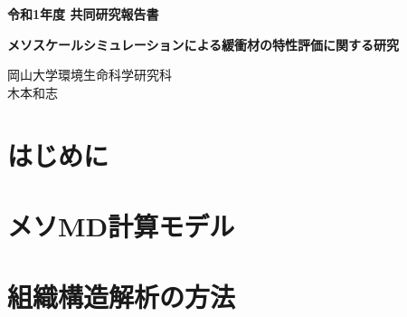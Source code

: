 ﻿\documentclass[11pt,a4j]{jarticle}
\newlength{\minitwocolumn}
\begin{document}
\newcommand{\fat}[1]{\mbox{\boldmath $#1$}}
\newcommand{\D}{\partial}
\newcommand{\w}{\omega}
\newcommand{\ga}{\alpha}
\newcommand{\gb}{\beta}
\newcommand{\gx}{\xi}
\newcommand{\gz}{\zeta}
\newcommand{\vhat}[1]{\hat{\fat{#1}}}
\newcommand{\spc}{\vspace{0.7\baselineskip}}
\newcommand{\halfspc}{\vspace{0.3\baselineskip}}

\pagestyle{empty}
\newcommand{\twofig}[2]
 {
   \begin{figure}[h]
     \begin{minipage}[t]{\minitwocolumn}
         \begin{center}   #1
         \end{center}
     \end{minipage}
         \hspace{\columnsep}
     \begin{minipage}[t]{\minitwocolumn}
         \begin{center} #2
         \end{center}
     \end{minipage}
   \end{figure}
 }
\begin{center}
{\Large \bf 令和1年度 共同研究報告書}
\end{center}
\vspace{2mm}
\begin{center}
{\LARGE \bf 
メソスケールシミュレーションによる緩衝材の特性評価に関する研究} 
\end{center}
\begin{center}
岡山大学環境生命科学研究科\\
木本和志
\end{center}
\vspace{10mm}
\section{はじめに}

\section{メソMD計算モデル}

\section{組織構造解析の方法}

\end{document}
